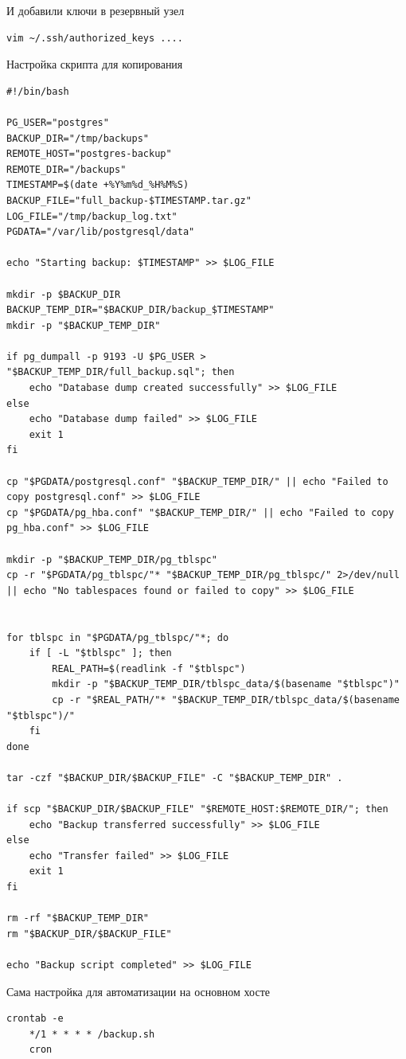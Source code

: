\documentclass{article}
\begin{document}
И добавили ключи в резервный узел
\begin{lstlisting}[caption={kitty}, label={lst:example}]
    vim ~/.ssh/authorized_keys ....
\end{lstlisting}

Настройка скрипта для копирования
\begin{lstlisting}[caption={kitty}, label={lst:example}]
#!/bin/bash

PG_USER="postgres"
BACKUP_DIR="/tmp/backups"
REMOTE_HOST="postgres-backup"
REMOTE_DIR="/backups"
TIMESTAMP=$(date +%Y%m%d_%H%M%S)
BACKUP_FILE="full_backup-$TIMESTAMP.tar.gz"
LOG_FILE="/tmp/backup_log.txt"
PGDATA="/var/lib/postgresql/data"

echo "Starting backup: $TIMESTAMP" >> $LOG_FILE

mkdir -p $BACKUP_DIR
BACKUP_TEMP_DIR="$BACKUP_DIR/backup_$TIMESTAMP"
mkdir -p "$BACKUP_TEMP_DIR"

if pg_dumpall -p 9193 -U $PG_USER > "$BACKUP_TEMP_DIR/full_backup.sql"; then
    echo "Database dump created successfully" >> $LOG_FILE
else
    echo "Database dump failed" >> $LOG_FILE
    exit 1
fi

cp "$PGDATA/postgresql.conf" "$BACKUP_TEMP_DIR/" || echo "Failed to copy postgresql.conf" >> $LOG_FILE
cp "$PGDATA/pg_hba.conf" "$BACKUP_TEMP_DIR/" || echo "Failed to copy pg_hba.conf" >> $LOG_FILE

mkdir -p "$BACKUP_TEMP_DIR/pg_tblspc"
cp -r "$PGDATA/pg_tblspc/"* "$BACKUP_TEMP_DIR/pg_tblspc/" 2>/dev/null || echo "No tablespaces found or failed to copy" >> $LOG_FILE


for tblspc in "$PGDATA/pg_tblspc/"*; do
    if [ -L "$tblspc" ]; then
        REAL_PATH=$(readlink -f "$tblspc")
        mkdir -p "$BACKUP_TEMP_DIR/tblspc_data/$(basename "$tblspc")"
        cp -r "$REAL_PATH/"* "$BACKUP_TEMP_DIR/tblspc_data/$(basename "$tblspc")/"
    fi
done

tar -czf "$BACKUP_DIR/$BACKUP_FILE" -C "$BACKUP_TEMP_DIR" .

if scp "$BACKUP_DIR/$BACKUP_FILE" "$REMOTE_HOST:$REMOTE_DIR/"; then
    echo "Backup transferred successfully" >> $LOG_FILE
else
    echo "Transfer failed" >> $LOG_FILE
    exit 1
fi

rm -rf "$BACKUP_TEMP_DIR"
rm "$BACKUP_DIR/$BACKUP_FILE"

echo "Backup script completed" >> $LOG_FILE
\end{lstlisting}

Сама настройка для автоматизации на основном хосте
\begin{lstlisting}[caption={kitty}, label={lst:example}]
    crontab -e 
    */1 * * * * /backup.sh
    cron
\end{lstlisting}
\end{document}
